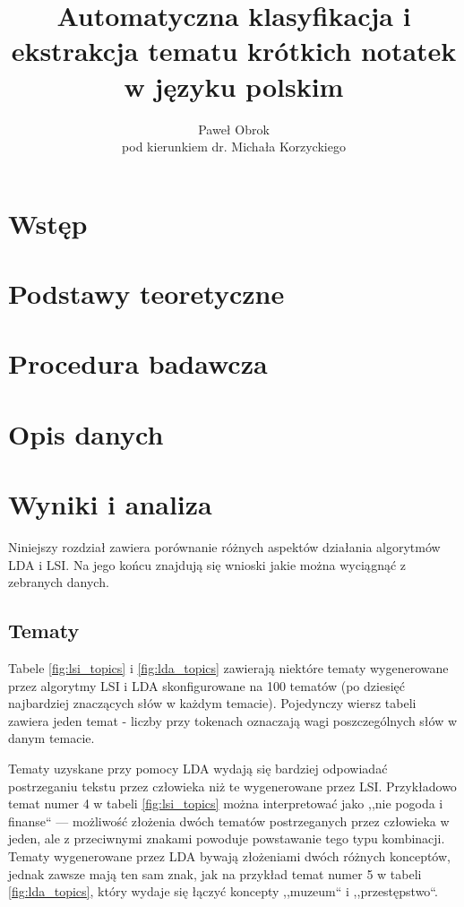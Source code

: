 \documentclass[11pt,a4paper]{article}
\begin{document}
\title{Automatyczna klasyfikacja i ekstrakcja tematu krótkich notatek w języku polskim}
\author{Paweł Obrok\\pod kierunkiem dr. Michała Korzyckiego}

\maketitle
\pagebreak

\tableofcontents
\pagebreak

\section{Wstęp}
\section{Podstawy teoretyczne}
\section{Procedura badawcza}
\section{Opis danych}
\section{Wyniki i analiza}

Niniejszy rozdział zawiera porównanie różnych aspektów działania algorytmów LDA
i LSI. Na jego końcu znajdują się wnioski jakie można wyciągnąć z zebranych
danych.

\subsection{Tematy}

Tabele \ref{fig:lsi_topics} i \ref{fig:lda_topics} zawierają niektóre tematy
wygenerowane przez algorytmy LSI i LDA skonfigurowane na 100 tematów (po
dziesięć najbardziej znaczących słów w każdym temacie). Pojedynczy wiersz
tabeli zawiera jeden temat - liczby przy tokenach oznaczają wagi poszczególnych
słów w danym temacie.

Tematy uzyskane przy pomocy LDA wydają się bardziej odpowiadać postrzeganiu
tekstu przez człowieka niż te wygenerowane przez LSI.  Przykładowo temat numer 4 w tabeli
\ref{fig:lsi_topics} można interpretować jako ,,nie pogoda i finanse`` ---
możliwość złożenia dwóch tematów postrzeganych przez człowieka w jeden, ale z
przeciwnymi znakami powoduje powstawanie tego typu kombinacji. Tematy wygenerowane
przez LDA bywają złożeniami dwóch różnych konceptów, jednak zawsze mają ten sam znak,
jak na przykład temat numer 5 w tabeli \ref{fig:lda_topics}, który wydaje się łączyć
koncepty ,,muzeum`` i ,,przestępstwo``.
\end{document}
